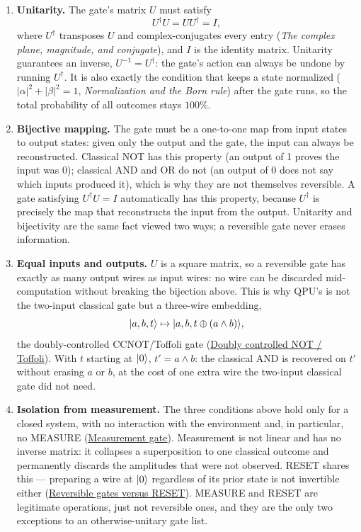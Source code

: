 \begin{enumerate}
  \item \textbf{Unitarity.} The gate's matrix $U$ must satisfy
  \[
  U^\dagger U=UU^\dagger=I,
  \]
  where $U^\dagger$ transposes $U$ and complex-conjugates every entry
  (\emph{The complex plane, magnitude, and conjugate}), and $I$ is the
  identity matrix. Unitarity guarantees an inverse, $U^{-1}=U^\dagger$: the
  gate's action can always be undone by running $U^\dagger$. It is also
  exactly the condition that keeps a state normalized
  ($|\alpha|^2+|\beta|^2=1$, \emph{Normalization and the Born rule}) after the
  gate runs, so the total probability of all outcomes stays $100\%$.

  \item \textbf{Bijective mapping.} The gate must be a one-to-one map from
  input states to output states: given only the output and the gate, the
  input can always be reconstructed. Classical NOT has this property (an
  output of 1 proves the input was 0); classical AND and OR do not (an output
  of 0 does not say which inputs produced it), which is why they are not
  themselves reversible. A gate satisfying $U^\dagger U=I$ automatically has
  this property, because $U^\dagger$ is precisely the map that reconstructs
  the input from the output. Unitarity and bijectivity are the same fact
  viewed two ways; a reversible gate never erases information.

  \item \textbf{Equal inputs and outputs.} $U$ is a square matrix, so a
  reversible gate has exactly as many output wires as input wires: no wire
  can be discarded mid-computation without breaking the bijection above. This
  is why QPU's  is not the two-input classical gate but a
  three-wire embedding,
  \[
  \lvert a,b,t\rangle\mapsto\lvert a,b,t\oplus(a\land b)\rangle,
  \]
  the doubly-controlled CCNOT/Toffoli gate
  (\hyperlink{ccnot-and-embedding}{Doubly controlled NOT / Toffoli}). With
  $t$ starting at $\lvert 0\rangle$, $t'=a\land b$: the classical AND is recovered on
  $t'$ without erasing $a$ or $b$, at the cost of one extra wire the
  two-input classical gate did not need.

  \item \textbf{Isolation from measurement.} The three conditions above hold
  only for a closed system, with no interaction with the environment and, in
  particular, no MEASURE (\hyperlink{measure-collapse}{Measurement gate}).
  Measurement is not linear and has no inverse matrix: it collapses a
  superposition to one classical outcome and permanently discards the
  amplitudes that were not observed. RESET shares this --- preparing a wire
  at $\lvert 0\rangle$ regardless of its prior state is not invertible either
  (\hyperlink{reset-semantics}{Reversible gates versus RESET}). MEASURE and
  RESET are legitimate operations, just not reversible ones, and they are the
  only two exceptions to an otherwise-unitary gate list.
\end{enumerate}


